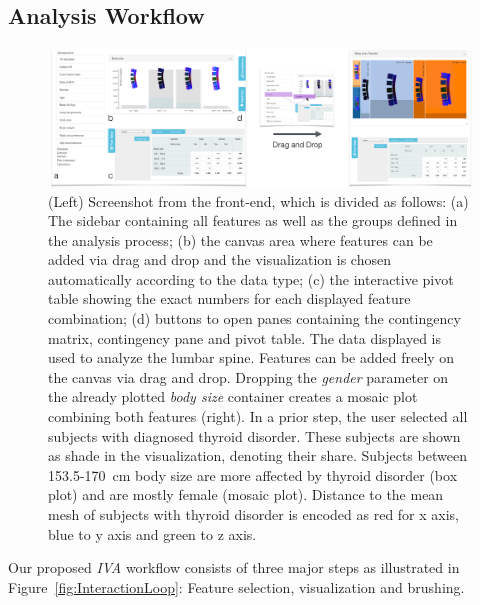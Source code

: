 \documentclass[journal]{style/vgtc} 			          %
\begin{document}
\subsection{Analysis Workflow}
\begin{figure}[htb]
 \centering
 \includegraphics[width=1\textwidth, resolution=300]{figures/visualization}
 \caption{
 (Left) Screenshot from the front-end, which is divided as follows: (a) The sidebar containing all features as well as the groups defined in the analysis process; (b) the canvas area where features can be added via drag and drop and the visualization is chosen automatically according to the data type; (c) the interactive pivot table showing the exact numbers for each displayed feature combination; (d) buttons to open panes containing the contingency matrix, contingency pane and pivot table.
 The data displayed is used to analyze the lumbar spine. Features can be added freely on the canvas via drag and drop.
 Dropping the \emph{gender} parameter on the already plotted \emph{body size} container creates a mosaic plot combining both features (right).
 In a prior step, the user selected all subjects with diagnosed thyroid disorder.
 These subjects are shown as shade in the visualization, denoting their share.
 Subjects between 153.5-170~cm body size are more affected by thyroid disorder (box plot) and are mostly female (mosaic plot).
 Distance to the mean mesh of subjects with thyroid disorder is encoded as red for x axis, blue to y axis and green to z axis.
 }
 \label{fig:visualization}
\end{figure}
Our proposed \emph{IVA} workflow consists of three major steps as illustrated in Figure~\ref{fig:InteractionLoop}: Feature selection, visualization and brushing.
\end{document}
